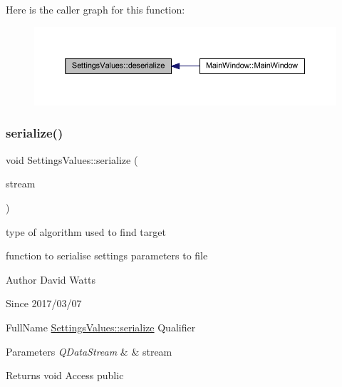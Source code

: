 Here is the caller graph for this function\+:
\nopagebreak
\begin{figure}[H]
\begin{center}
\leavevmode
\includegraphics[width=350pt]{struct_settings_values_aa8366afce6108e4404af7d6f98ad1368_icgraph}
\end{center}
\end{figure}
\mbox{\label{struct_settings_values_ad4544b482570ff509c6afef78071a003}} 
\subsubsection{\texorpdfstring{serialize()}{serialize()}}
{\footnotesize\ttfamily void Settings\+Values\+::serialize (\begin{DoxyParamCaption}\item[{Q\+Data\+Stream \&}]{stream }\end{DoxyParamCaption})\hspace{0.3cm}{\ttfamily [inline]}}



type of algorithm used to find target 

function to serialise settings parameters to file

\begin{DoxyAuthor}{Author}
David Watts 
\end{DoxyAuthor}
\begin{DoxySince}{Since}
2017/03/07
\end{DoxySince}
Full\+Name \hyperlink{struct_settings_values_ad4544b482570ff509c6afef78071a003}{Settings\+Values\+::serialize} Qualifier 
\begin{DoxyParams}{Parameters}
{\em Q\+Data\+Stream} & \& stream \\
\hline
\end{DoxyParams}
\begin{DoxyReturn}{Returns}
void Access public 
\end{DoxyReturn}


